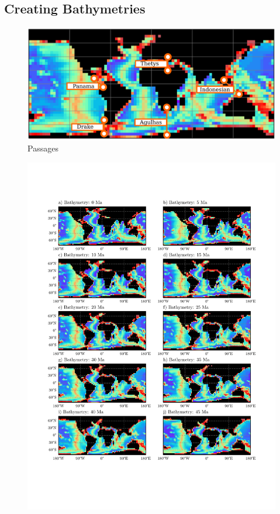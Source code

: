 \documentclass[a4paper]{article}
\begin{document}
\begin{multicols}{2}
\subsection{Creating Bathymetries}

\end{multicols}
\begin{figure}[H]
	\includegraphics[width=\linewidth]{passages.png}
	\caption{Passages}
	\label{fig:passages}
\end{figure}
\begin{figure}[H]
	\includegraphics[width=\linewidth]{bathymetries_1.pdf}
\end{figure}
\end{document}
